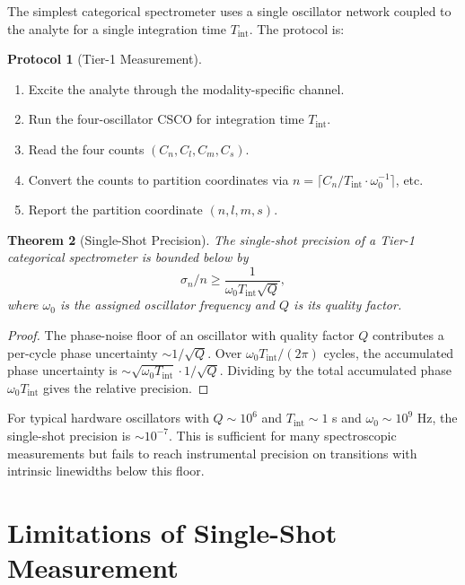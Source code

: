 \documentclass[11pt,a4paper]{article}
\theoremstyle{thmstyle}
\newtheorem{theorem}{Theorem}[section]
\theoremstyle{axiomstyle}
\theoremstyle{definition}
\newtheorem{protocol}[theorem]{Protocol}
\theoremstyle{remark}
\begin{document}
The simplest categorical spectrometer uses a single oscillator network coupled to the analyte for a single integration time $T_{\mathrm{int}}$. The protocol is:

\begin{protocol}[Tier-1 Measurement]\label{prot:tier1}
\begin{enumerate}[label=\arabic*.,nosep]
\item Excite the analyte through the modality-specific channel.
\item Run the four-oscillator CSCO for integration time $T_{\mathrm{int}}$.
\item Read the four counts $(C_{n},C_{l},C_{m},C_{s})$.
\item Convert the counts to partition coordinates via $n=\lceil C_{n}/T_{\mathrm{int}}\cdot\omega_{0}^{-1}\rceil$, etc.
\item Report the partition coordinate $(n,l,m,s)$.
\end{enumerate}
\end{protocol}

\begin{theorem}[Single-Shot Precision]\label{thm:tier1prec}
The single-shot precision of a Tier-1 categorical spectrometer is bounded below by
\begin{equation}
\sigma_{n}/n\geq\frac{1}{\omega_{0}T_{\mathrm{int}}\sqrt{Q}},
\end{equation}
where $\omega_{0}$ is the assigned oscillator frequency and $Q$ is its quality factor.
\end{theorem}

\begin{proof}
The phase-noise floor of an oscillator with quality factor $Q$ contributes a per-cycle phase uncertainty $\sim 1/\sqrt{Q}$. Over $\omega_{0}T_{\mathrm{int}}/(2\pi)$ cycles, the accumulated phase uncertainty is $\sim\sqrt{\omega_{0}T_{\mathrm{int}}}\cdot 1/\sqrt{Q}$. Dividing by the total accumulated phase $\omega_{0}T_{\mathrm{int}}$ gives the relative precision.
\end{proof}

For typical hardware oscillators with $Q\sim 10^{6}$ and $T_{\mathrm{int}}\sim 1$ s and $\omega_{0}\sim 10^{9}$ Hz, the single-shot precision is $\sim 10^{-7}$. This is sufficient for many spectroscopic measurements but fails to reach instrumental precision on transitions with intrinsic linewidths below this floor.

\section{Limitations of Single-Shot Measurement}
\label{sec:tier1limits}
\end{document}
